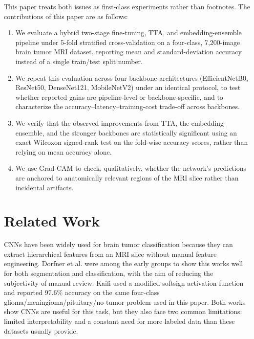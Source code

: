 \documentclass[11pt]{article}
\begin{document}
This paper treats both issues as first-class experiments rather than footnotes. The contributions of this paper are as follows:

\begin{enumerate}
    \item We evaluate a hybrid two-stage fine-tuning, TTA, and embedding-ensemble pipeline under 5-fold stratified cross-validation on a four-class, 7,200-image brain tumor MRI dataset, reporting mean and standard-deviation accuracy instead of a single train/test split number.
    \item We repeat this evaluation across four backbone architectures (EfficientNetB0, ResNet50, DenseNet121, MobileNetV2) under an identical protocol, to test whether reported gains are pipeline-level or backbone-specific, and to characterize the accuracy--latency--training-cost trade-off across backbones.
    \item We verify that the observed improvements from TTA, the embedding ensemble, and the stronger backbones are statistically significant using an exact Wilcoxon signed-rank test on the fold-wise accuracy scores, rather than relying on mean accuracy alone.
    \item We use Grad-CAM to check, qualitatively, whether the network's predictions are anchored to anatomically relevant regions of the MRI slice rather than incidental artifacts.
\end{enumerate}


\section{Related Work}
\label{sec:related}

CNNs have been widely used for brain tumor classification because they can extract hierarchical features from an MRI slice without manual feature engineering. Dorfner et al. \cite{r16} were among the early groups to show this works well for both segmentation and classification, with the aim of reducing the subjectivity of manual review. Kaifi \cite{r17} used a modified softsign activation function and reported 97.6\% accuracy on the same four-class glioma/meningioma/pituitary/no-tumor problem used in this paper. Both works show CNNs are useful for this task, but they also face two common limitations: limited interpretability and a constant need for more labeled data than these datasets usually provide.
\end{document}
